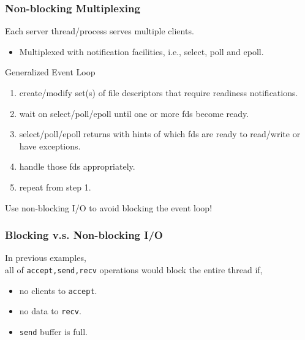 \documentclass[aspectratio=43]{beamer}
\begin{document}


\begin{frame}[fragile]
  \frametitle{Non-blocking Multiplexing}
  Each server thread/process serves multiple clients.\\
  \begin{itemize}
  \item Multiplexed with notification facilities, i.e., select, poll and epoll.
  \end{itemize}
  Generalized Event Loop
  \begin{enumerate}
  \item create/modify set(s) of file descriptors that require readiness notifications.
  \item wait on select/poll/epoll until one or more fds become ready.
  \item select/poll/epoll returns with hints of which fds are ready to read/write or have exceptions.
  \item handle those fds appropriately.
  \item repeat from step 1.
  \end{enumerate}
  \vspace{1em}
  \begin{center}
  {\large Use non-blocking I/O to avoid blocking the event loop!}
  \end{center}
\end{frame}

\begin{frame}
  \frametitle{Blocking v.s. Non-blocking I/O}

\hspace*{2em} \begin{minipage}{.8\textwidth}
In previous examples,\\[1em]
all of {\tt accept,send,recv} operations would block the entire thread if,
\begin{itemize}
\item no clients to {\tt accept}.
\item no data to {\tt recv}.
\item {\tt send} buffer is full.
\end{itemize}
\vspace{1em}
\end{minipage}
\end{frame}
\end{document}
